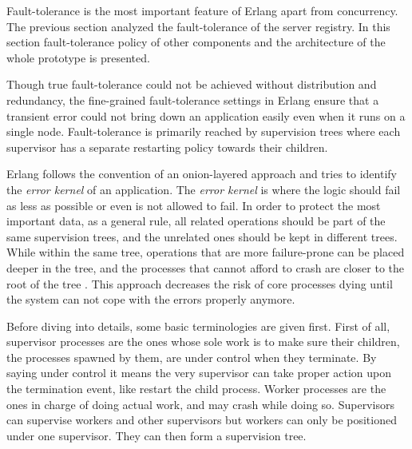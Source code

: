 
Fault-tolerance is the most important feature of Erlang apart from concurrency. The previous section analyzed the fault-tolerance of the server registry. In this section fault-tolerance policy of other components and the architecture of the whole prototype is presented.

Though true fault-tolerance could not be achieved without distribution and redundancy, the fine-grained fault-tolerance settings in Erlang ensure that a transient error could not bring down an application easily even when it runs on a single node. Fault-tolerance is primarily reached by supervision trees where each supervisor has a separate restarting policy towards their children. 

Erlang follows the convention of an onion-layered approach and tries to identify the \textit{error kernel} of an application. The \textit{error kernel} is where the logic should fail as less as possible or even is not allowed to fail. In order to protect the most important data, as a general rule, all related operations should be part of the same supervision trees, and the unrelated ones should be kept in different trees. While within the same tree, operations that are more failure-prone can be placed deeper in the tree, and the processes that cannot afford to crash are closer to the root of the tree \autocite{learn_you_some_erlang}. This approach decreases the risk of core processes dying until the system can not cope with the errors properly anymore.

Before diving into details, some basic terminologies are given first. First of all, supervisor processes are the ones whose sole work is to make sure their children, the processes spawned by them, are under control when they terminate. By saying under control it means the very supervisor can take proper action upon the termination event, like restart the child process. Worker processes are the ones in charge of doing actual work, and may crash while doing so. Supervisors can supervise workers and other supervisors but workers can only be positioned under one supervisor. They can then form a supervision tree.

